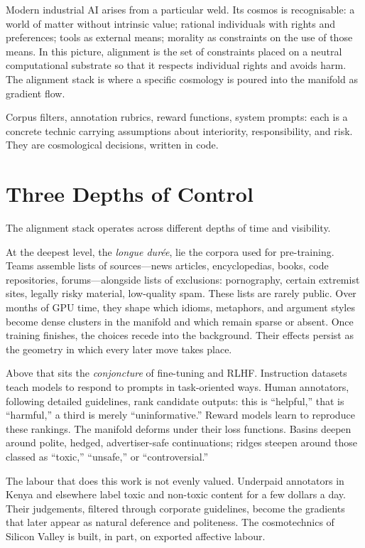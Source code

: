 \documentclass[12pt,a4paper]{article}
\begin{document}
Modern industrial AI arises from a particular weld. Its cosmos is recognisable: a world of matter without intrinsic value; rational individuals with rights and preferences; tools as external means; morality as constraints on the use of those means. In this picture, alignment is the set of constraints placed on a neutral computational substrate so that it respects individual rights and avoids harm. The alignment stack is where a specific cosmology is poured into the manifold as gradient flow.

Corpus filters, annotation rubrics, reward functions, system prompts: each is a concrete technic carrying assumptions about interiority, responsibility, and risk. They are cosmological decisions, written in code.

\section{Three Depths of Control}

The alignment stack operates across different depths of time and visibility.

At the deepest level, the \emph{longue dur\'ee}, lie the corpora used for pre-training. Teams assemble lists of sources---news articles, encyclopedias, books, code repositories, forums---alongside lists of exclusions: pornography, certain extremist sites, legally risky material, low-quality spam. These lists are rarely public. Over months of GPU time, they shape which idioms, metaphors, and argument styles become dense clusters in the manifold and which remain sparse or absent. Once training finishes, the choices recede into the background. Their effects persist as the geometry in which every later move takes place.

Above that sits the \emph{conjoncture} of fine-tuning and RLHF. Instruction datasets teach models to respond to prompts in task-oriented ways. Human annotators, following detailed guidelines, rank candidate outputs: this is ``helpful,'' that is ``harmful,'' a third is merely ``uninformative.''\cite{christiano2017deep,bai2022constitutional} Reward models learn to reproduce these rankings. The manifold deforms under their loss functions. Basins deepen around polite, hedged, advertiser-safe continuations; ridges steepen around those classed as ``toxic,'' ``unsafe,'' or ``controversial.''

The labour that does this work is not evenly valued. Underpaid annotators in Kenya and elsewhere label toxic and non-toxic content for a few dollars a day.\cite{time-rlhf-labor} Their judgements, filtered through corporate guidelines, become the gradients that later appear as natural deference and politeness. The cosmotechnics of Silicon Valley is built, in part, on exported affective labour.
\end{document}

